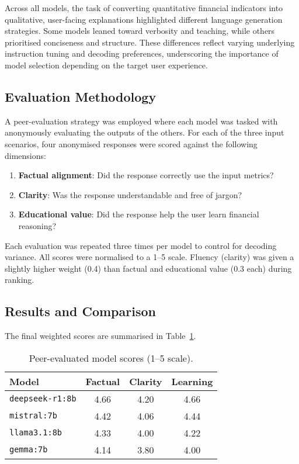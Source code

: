 Across all models, the task of converting quantitative financial indicators into qualitative, user-facing explanations highlighted different language generation strategies. Some models leaned toward verbosity and teaching, while others prioritised conciseness and structure. These differences reflect varying underlying instruction tuning and decoding preferences, underscoring the importance of model selection depending on the target user experience.

\subsection{Evaluation Methodology}

A peer-evaluation strategy was employed where each model was tasked with anonymously evaluating the outputs of the others. For each of the three input scenarios, four anonymised responses were scored against the following dimensions:

\begin{enumerate}
    \item \textbf{Factual alignment}: Did the response correctly use the input metrics?
    \item \textbf{Clarity}: Was the response understandable and free of jargon?
    \item \textbf{Educational value}: Did the response help the user learn financial reasoning?
\end{enumerate}

Each evaluation was repeated three times per model to control for decoding variance. All scores were normalised to a 1–5 scale. Fluency (clarity) was given a slightly higher weight (0.4) than factual and educational value (0.3 each) during ranking.

\subsection{Results and Comparison}

The final weighted scores are summarised in Table~\ref{tab:model_scores}.

\begin{table}[ht]
\centering
\begin{tabular}{lccc}
\textbf{Model} & \textbf{Factual} & \textbf{Clarity} & \textbf{Learning} \\
\hline
\texttt{deepseek-r1:8b} & 4.66 & 4.20 & 4.66 \\
\texttt{mistral:7b}     & 4.42 & 4.06 & 4.44 \\
\texttt{llama3.1:8b}    & 4.33 & 4.00 & 4.22 \\
\texttt{gemma:7b}       & 4.14 & 3.80 & 4.00 \\
\end{tabular}
\caption{Peer-evaluated model scores (1–5 scale).}
\label{tab:model_scores}
\end{table}

